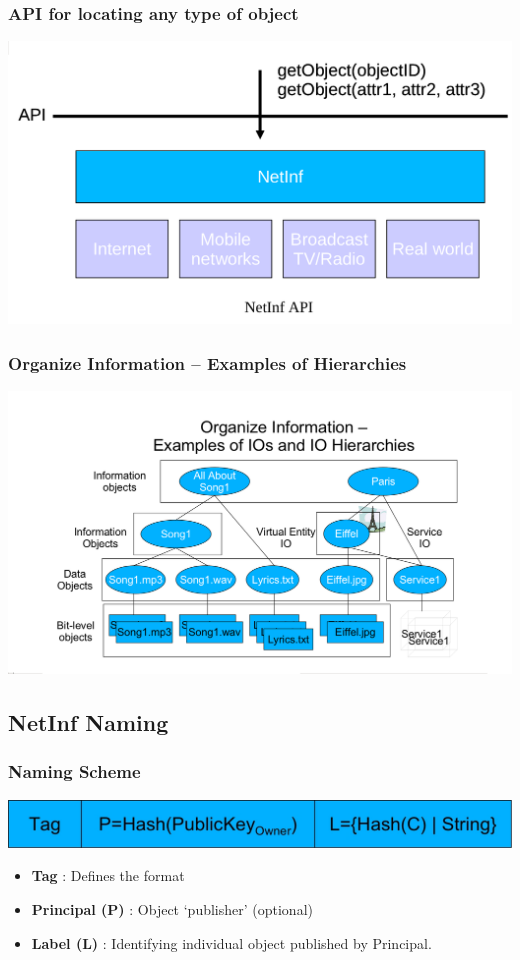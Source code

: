 \documentclass [12pt] {beamer}
\begin{document}
\begin{frame}
 \frametitle{API for locating any type of object}
\begin{center}
 \includegraphics[scale=.2,keepaspectratio=true]{Netinf3.png}
\end{center}
\end{frame}

\begin{frame}
 \frametitle{Organize Information – Examples of Hierarchies}
  \begin{center}
    \includegraphics[keepaspectratio=true,scale=.22]{netinf2.png}
  \end{center}
\end{frame}

\subsection{NetInf Naming}
\begin{frame}
\frametitle{Naming Scheme}
\begin{center}
 \includegraphics[keepaspectratio=true,scale=.24]{netinfnaming.jpg}
\end{center}
\begin{itemize}
 \item \textbf{Tag} : Defines the format
 \item \textbf{Principal (P)} : Object ‘publisher’ (optional)
 \item \textbf{Label (L)} : Identifying individual object published by Principal. 
\end{itemize}

\end{frame}
\end{document}
